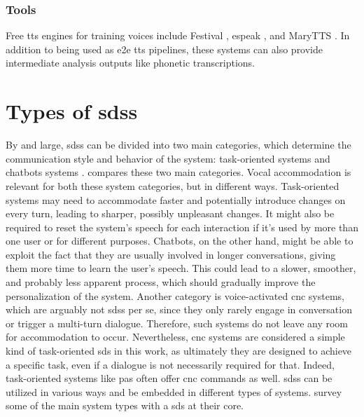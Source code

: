 \subsubsection{Tools}
\label{subsubsec:tools_tts}

Free \ac{tts} engines for training voices include Festival \citep{Black1997festival}, espeak \citep{Duddington2012espeak}, and MaryTTS \citep{Schroder2011open}.
In addition to being used as \ac{e2e} \ac{tts} pipelines, these systems can also provide intermediate analysis outputs like phonetic transcriptions.

\section{Types of \aclp{sds}}
\label{sec:types_of_sdss}

By and large, \acp{sds} can be divided into two main categories, which determine the communication style and behavior of the system: task-oriented systems \citep[e.g.,][]{Wen2016network, Zhao2016towards} and chatbots systems \citep[e.g.,][]{Vinyals2015neural, Li2016deep}.
 compares these two main categories.
Vocal accommodation is relevant for both these system categories, but in different ways.
Task-oriented systems may need to accommodate faster and potentially introduce changes on every turn, leading to sharper, possibly unpleasant changes.
It might also be required to reset the system's speech for each interaction if it's used by more than one user or for different purposes.
Chatbots, on the other hand, might be able to exploit the fact that they are usually involved in longer conversations, giving them more time to learn the user's speech.
This could lead to a slower, smoother, and probably less apparent process, which should gradually improve the personalization of the system.
Another category is voice-activated \ac{cnc} systems, which are arguably not \acp{sds} per se, since they only rarely engage in conversation  or trigger a multi-turn dialogue.
Therefore, such systems do not leave any room for accommodation to occur.
Nevertheless, \ac{cnc} systems are considered a simple kind of task-oriented \ac{sds} in this work, as ultimately they are designed to achieve a specific task, even if a dialogue is not necessarily required for that.
Indeed, task-oriented systems like \acp{pa} often offer \ac{cnc} commands as well.
\Acp{sds} can be utilized in various ways and be embedded in different types of systems.
 survey some of the main system types with a \ac{sds} at their core.
